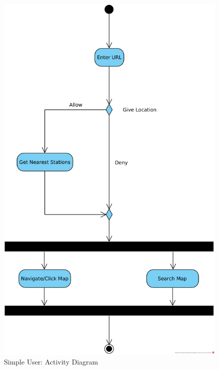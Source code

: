 \begin{figure}[H]
    \centering
    \includegraphics[]{media/Activity/Simple_User.png}
	\caption{Simple User: Activity Diagram}
	\label{fig:Simple_User_Activity}
\end{figure}



